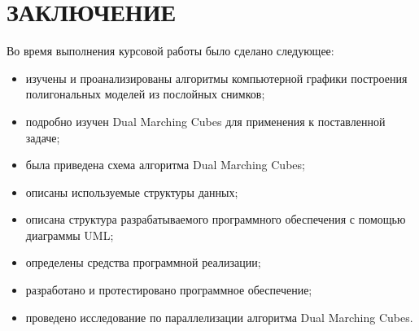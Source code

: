 \chapter*{ЗАКЛЮЧЕНИЕ}

Во время выполнения курсовой работы было сделано следующее:
\begin{itemize}
    \item изучены и проанализированы алгоритмы компьютерной графики построения полигональных моделей из послойных снимков;
    \item подробно изучен Dual Marching Cubes для применения к поставленной задаче;
    \item была приведена схема алгоритма Dual Marching Cubes;
    \item описаны используемые структуры данных;
    \item описана структура разрабатываемого программного обеспечения с помощью диаграммы UML;
    \item определены средства программной реализации;
    \item разработано и протестировано программное обеспечение;
    \item проведено исследование по параллелизации алгоритма Dual Marching Cubes.
\end{itemize}

